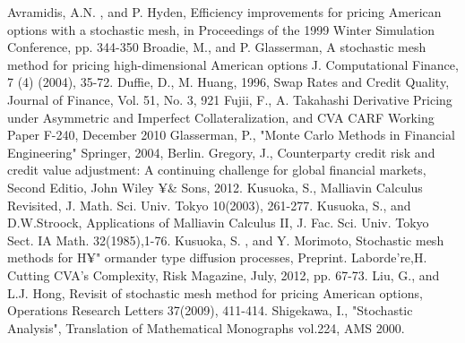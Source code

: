 \documentclass[12pt]{article}
\begin{document}
 \newpage
\begin{thebibliography}{99}
Avramidis, A.N. , and P. Hyden, 
\newblock Efficiency improvements for pricing American options 
with a stochastic mesh, 
\newblock in Proceedings of the 1999 Winter Simulation Conference, pp. 344-350
 Broadie, M., and P. Glasserman,
\newblock A stochastic mesh method for pricing high-dimensional American options
\newblock J. Computational Finance, 7 (4) (2004), 35-72.
 Duffie, D., M. Huang, 1996,
\newblock  Swap Rates and Credit Quality, 
\newblock Journal of Finance, Vol. 51, No. 3, 921
 Fujii, F., A. Takahashi
\newblock Derivative Pricing under Asymmetric and Imperfect Collateralization, and CVA
\newblock CARF Working Paper F-240, December 2010
  Glasserman, P.,
\newblock "Monte Carlo Methods in Financial Engineering"
\newblock Springer,  2004, Berlin. 
Gregory, J.,
\newblock Counterparty credit risk and credit value adjustment: A continuing challenge for global financial markets, Second Editio,
\newblock John Wiley ¥& Sons, 2012.
Kusuoka, S.,
\newblock Malliavin Calculus Revisited,
\newblock  J. Math. Sci. Univ. Tokyo 10(2003), 261-277.
Kusuoka, S., and D.W.Stroock, 
\newblock Applications of Malliavin Calculus II,
\newblock J. Fac. Sci. Univ. Tokyo Sect. IA Math. 32(1985),1-76.
Kusuoka, S. , and Y. Morimoto, 
\newblock Stochastic mesh methods for H{¥" o}rmander type diffusion processes, 
\newblock Preprint.
 Laborde're,H.
\newblock Cutting CVA's Complexity,
\newblock Risk Magazine, July, 2012, pp. 67-73.
 Liu, G., and L.J. Hong,
\newblock Revisit of stochastic mesh method for pricing American options,
\newblock Operations Research Letters 37(2009), 411-414.
Shigekawa, I.,
\newblock "Stochastic Analysis",
\newblock Translation of Mathematical Monographs vol.224,
AMS 2000.
\end{thebibliography}
\end{document}
